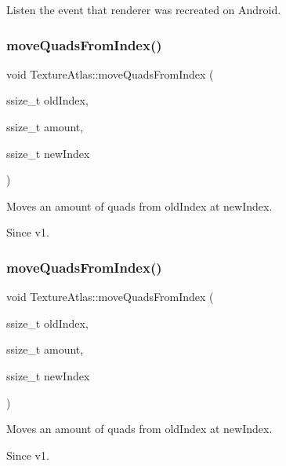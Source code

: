 Listen the event that renderer was recreated on Android. \mbox{\label{classTextureAtlas_a074c3252ea542b77ae254a97917b51df}} 
\subsubsection{\texorpdfstring{move\+Quads\+From\+Index()}{moveQuadsFromIndex()}\hspace{0.1cm}{\footnotesize\ttfamily [1/4]}}
{\footnotesize\ttfamily void Texture\+Atlas\+::move\+Quads\+From\+Index (\begin{DoxyParamCaption}\item[{ssize\+\_\+t}]{old\+Index,  }\item[{ssize\+\_\+t}]{amount,  }\item[{ssize\+\_\+t}]{new\+Index }\end{DoxyParamCaption})}

Moves an amount of quads from old\+Index at new\+Index. \begin{DoxySince}{Since}
v1. 
\end{DoxySince}
\mbox{\label{classTextureAtlas_a074c3252ea542b77ae254a97917b51df}} 
\subsubsection{\texorpdfstring{move\+Quads\+From\+Index()}{moveQuadsFromIndex()}\hspace{0.1cm}{\footnotesize\ttfamily [2/4]}}
{\footnotesize\ttfamily void Texture\+Atlas\+::move\+Quads\+From\+Index (\begin{DoxyParamCaption}\item[{ssize\+\_\+t}]{old\+Index,  }\item[{ssize\+\_\+t}]{amount,  }\item[{ssize\+\_\+t}]{new\+Index }\end{DoxyParamCaption})}

Moves an amount of quads from old\+Index at new\+Index. \begin{DoxySince}{Since}
v1. 
\end{DoxySince}
\mbox{\label{classTextureAtlas_aa4fb28570142da6c7a47aba59a4f021b}} 
